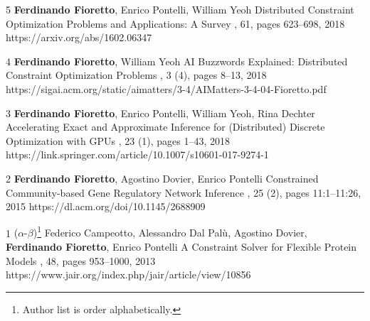 \begin{pubs}
	\journalentry
	{5}	%
		{{\bf Ferdinando Fioretto}, Enrico Pontelli, William Yeoh}
		{Distributed Constraint Optimization Problems and Applications: A Survey}
		{\JAIR, 61, pages 623--698, 2018} 
		{https://arxiv.org/abs/1602.06347}

	\journalentry 
	{4}	%
		{{\bf Ferdinando Fioretto}, William Yeoh}
		{AI Buzzwords Explained: Distributed Constraint Optimization Problems}
		{, 3 (4), pages 8--13, 2018}
		{https://sigai.acm.org/static/aimatters/3-4/AIMatters-3-4-04-Fioretto.pdf}

	\journalentry 
	{3}	%
		{{\bf Ferdinando Fioretto}, Enrico Pontelli, William Yeoh, Rina Dechter}
		{Accelerating Exact and Approximate Inference for (Distributed) Discrete Optimization with GPUs}
		{, 23 (1), pages 1--43, 2018}
		{https://link.springer.com/article/10.1007/s10601-017-9274-1}

	\journalentry 
	{2}	%
		{{\bf Ferdinando Fioretto}, Agostino Dovier, Enrico Pontelli}
		{Constrained Community-based Gene Regulatory Network Inference}
		{, 25 (2), pages 11:1--11:26, 2015}
		{https://dl.acm.org/doi/10.1145/2688909}

	\journalentry
	{1}	%
		{($\alpha$-$\beta$)\footnote{Author list is order alphabetically.} 
			Federico Campeotto, Alessandro Dal Pal\`{u}, Agostino Dovier,  {\bf Ferdinando Fioretto}, Enrico Pontelli}
		{A Constraint Solver for Flexible Protein Models}
		{\JAIR, 48, pages 953--1000, 2013}
		{https://www.jair.org/index.php/jair/article/view/10856}
\end{pubs}


